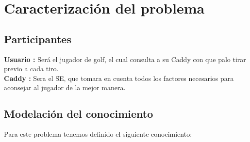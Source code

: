 \documentclass[runningheads,a4paper]{llncs}
\begin{document}
\section{Caracterización del problema}
\subsection{Participantes}
\textbf{Usuario :} Será el jugador de golf, el cual consulta a su Caddy con que palo tirar previo a cada tiro.\\
\textbf{Caddy :} Sera el SE, que tomara en cuenta todos los factores necesarios para aconsejar al jugador de la mejor manera.\\

\subsection{Modelación del conocimiento}
Para este problema tenemos definido el siguiente conocimiento:\\
\end{document}
